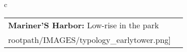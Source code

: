 \begin{table}[H]
        \begin{tabular}{c}
        \begin{tabular}{m{1.5in} m{2in}}
\textbf{Mariner'S Harbor:} {Low-rise in the park} & \texttt{[image: \\rootpath/IMAGES/typology\_earlytower.png]}
\end{tabular}\end{tabular}
        \end{table}